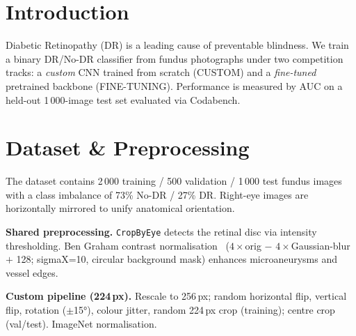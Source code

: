 \documentclass[a4paper, 10pt, twocolumn]{article}
\begin{document}

\section{Introduction}

Diabetic Retinopathy (DR) is a leading cause of preventable blindness.
We train a binary DR/No-DR classifier from fundus photographs under two
competition tracks: a \emph{custom} CNN trained from scratch (CUSTOM)
and a \emph{fine-tuned} pretrained backbone (FINE-TUNING).
Performance is measured by AUC on a held-out 1\,000-image test set
evaluated via Codabench.

\section{Dataset \& Preprocessing}

The dataset contains 2\,000 training / 500 validation / 1\,000 test
fundus images with a class imbalance of 73\% No-DR / 27\% DR.
Right-eye images are horizontally mirrored to unify anatomical orientation.

\textbf{Shared preprocessing.}
\texttt{CropByEye} detects the retinal disc via intensity thresholding.
Ben Graham contrast normalisation~\cite{graham2015kaggle}
($4{\times}$orig $-$ $4{\times}$Gaussian-blur $+$ 128; sigmaX=10,
circular background mask) enhances microaneurysms and vessel edges.

\textbf{Custom pipeline (224\,px).}
Rescale to 256\,px; random horizontal flip, vertical flip,
rotation ($\pm$15°), colour jitter, random 224\,px crop (training);
centre crop (val/test). ImageNet normalisation.
\end{document}
